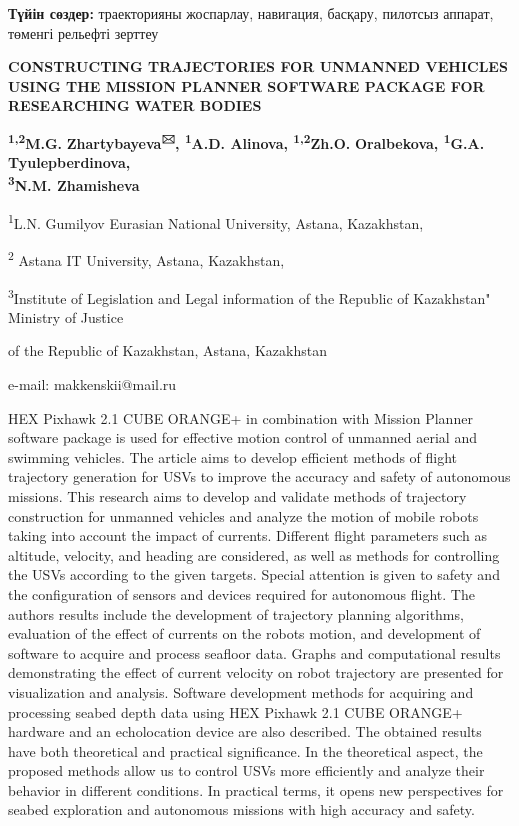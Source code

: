 {\bfseries Түйін сөздер:} траекторияны жоспарлау, навигация, басқару,
пилотсыз аппарат, төменгі рельефті зерттеу
\begin{center}

{\bfseries CONSTRUCTING TRAJECTORIES FOR UNMANNED VEHICLES USING THE MISSION PLANNER SOFTWARE PACKAGE FOR RESEARCHING WATER BODIES}

{\bfseries \textsuperscript{1,2}M.G.}
{\bfseries Zhartybayeva\textsuperscript{🖂}, \textsuperscript{1}A.D.
Alinova, \textsuperscript{1,2}Zh.O.} {\bfseries Oralbekova,
\textsuperscript{1}G.A.} {\bfseries Tyulepberdinova,\\
\textsuperscript{3}N.M. Zhamisheva}

\textsuperscript{1}L.N. Gumilyov Eurasian National University, Astana,
Kazakhstan,

\textsuperscript{2} Astana IT University, Astana, Kazakhstan,

\textsuperscript{3}Institute of Legislation and Legal information of the
Republic of Kazakhstan" Ministry of Justice

of the Republic of Kazakhstan, Astana, Kazakhstan

e-mail: makkenskii@mail.ru
\end{center}

HEX Pixhawk 2.1 CUBE ORANGE+ in combination with Mission Planner
software package is used for effective motion control of unmanned aerial
and swimming vehicles. The article aims to develop efficient methods of
flight trajectory generation for USVs to improve the accuracy and safety
of autonomous missions. This research aims to develop and validate
methods of trajectory construction for unmanned vehicles and analyze the
motion of mobile robots taking into account the impact of currents.
Different flight parameters such as altitude, velocity, and heading are
considered, as well as methods for controlling the USVs according to the
given targets. Special attention is given to safety and the
configuration of sensors and devices required for autonomous flight. The
author\textquotesingle s results include the development of trajectory
planning algorithms, evaluation of the effect of currents on the
robot\textquotesingle s motion, and development of software to acquire
and process seafloor data. Graphs and computational results
demonstrating the effect of current velocity on robot trajectory are
presented for visualization and analysis. Software development methods
for acquiring and processing seabed depth data using HEX Pixhawk 2.1
CUBE ORANGE+ hardware and an echolocation device are also described. The
obtained results have both theoretical and practical significance. In
the theoretical aspect, the proposed methods allow us to control USVs
more efficiently and analyze their behavior in different conditions. In
practical terms, it opens new perspectives for seabed exploration and
autonomous missions with high accuracy and safety.

